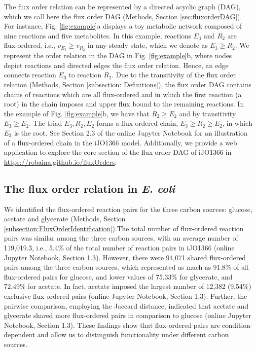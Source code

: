 \documentclass[12pt]{article}
\begin{document}
The flux order relation can be represented by a directed acyclic graph (DAG), which we call here the flux order DAG (Methods, Section \ref{sec:fluxorderDAG}). For instance, Fig. \ref{fig:example}a displays a toy metabolic network composed of nine reactions and five metabolites. In this example, reactions $E_3$ and $R_2$ are flux-ordered, i.e., $v_{E_3} \geq v_{R_2}$ in any steady state, which we denote as $E_3 \geq R_2$. We represent the order relation in the DAG in Fig. \ref{fig:example}b, where nodes depict reactions and directed edges the flux order relation. Hence, an edge connects reaction $E_3$ to reaction $R_2$. Due to the transitivity of the flux order relation (Methods, Section \ref{subsection: Definitions}), the flux order DAG contains chains of reactions which are all flux-ordered and in which the first reaction (a root) in the chain imposes and upper flux bound to the remaining reactions. In the example of Fig. \ref{fig:example}b, we have that $R_2 \geq E_2$ and by transitivity $E_3 \geq E_2$. The triad $E_3, R_2, E_2$ forms a flux-ordered chain, $E_3 \geq R_2 \geq E_2$, in which $E_3$ is the root. See Section 2.3 of the online Jupyter Notebook for an illustration of a flux-ordered chain in the iJO1366 model. Additionally, we provide a web application to explore the core section of the flux order DAG of iJO1366 in \url{https://robaina.github.io/fluxOrders}.

\subsection{The flux order relation in \emph{E. coli}}
We identified the flux-ordered reaction pairs for the three carbon sources: glucose, acetate and glycerate (Methods, Section \ref{subsection:FluxOrderIdentification}).The total number of flux-ordered reaction pairs was similar among the three carbon sources, with an average number of 119,019.3, i.e., 5.4\% of the total number of reaction pairs in iJO1366 (online Jupyter Notebook, Section 1.3). However, there were 94,071 shared flux-ordered pairs among the three carbon sources, which represented as much as 91.8\% of all flux-ordered pairs for glucose, and lower values of 75.33\% for glycerate, and 72.49\% for acetate. In fact, acetate imposed the largest number of 12,382 (9.54\%) exclusive flux-ordered pairs (online Jupyter Notebook, Section 1.3). Further, the pairwise comparison, employing the Jaccard distance, indicated that acetate and glycerate shared more flux-ordered pairs in comparison to glucose (online Jupyter Notebook, Section 1.3). These findings show that flux-ordered pairs are condition-dependent and allow us to distinguish functionality under different carbon sources.
\end{document}
